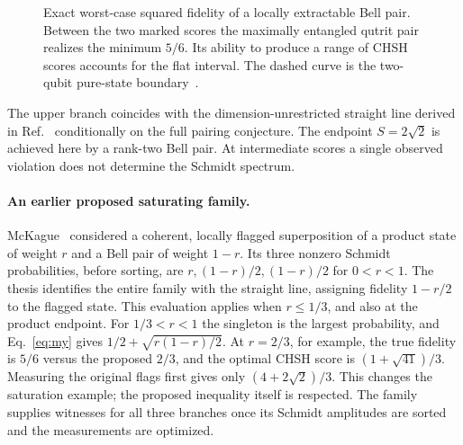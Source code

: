 \documentclass[11pt]{article}
\begin{document}
\begin{figure}[t]
\centering
{}
\caption{Exact worst-case squared fidelity of a locally extractable Bell pair. Between the two marked scores the maximally entangled qutrit pair realizes the minimum $5/6$. Its ability to produce a range of CHSH scores accounts for the flat interval. The dashed curve is the two-qubit pure-state boundary~\cite{bardyn}.}\label{fig:frontier}
\end{figure}

The upper branch coincides with the dimension-unrestricted straight line derived in Ref.~\cite[Eq.~(16)]{bardyn} conditionally on the full pairing conjecture. The endpoint $S=2\sqrt2$ is achieved here by a rank-two Bell pair. At intermediate scores a single observed violation does not determine the Schmidt spectrum.

\paragraph{An earlier proposed saturating family.}
McKague~\cite[Eq.~(5.59)]{mckague} considered a coherent, locally flagged superposition of a product state of weight $r$ and a Bell pair of weight $1-r$. Its three nonzero Schmidt probabilities, before sorting, are $r,(1-r)/2,(1-r)/2$ for $0<r<1$. The thesis identifies the entire family with the straight line, assigning fidelity $1-r/2$ to the flagged state. This evaluation applies when $r\le1/3$, and also at the product endpoint. For $1/3<r<1$ the singleton is the largest probability, and Eq.~\eqref{eq:my} gives $1/2+\sqrt{r(1-r)/2}$. At $r=2/3$, for example, the true fidelity is $5/6$ versus the proposed $2/3$, and the optimal CHSH score is $(1+\sqrt{41})/3$. Measuring the original flags first gives only $(4+2\sqrt2)/3$. This changes the saturation example; the proposed inequality itself is respected. The family supplies witnesses for all three branches once its Schmidt amplitudes are sorted and the measurements are optimized.
\end{document}
